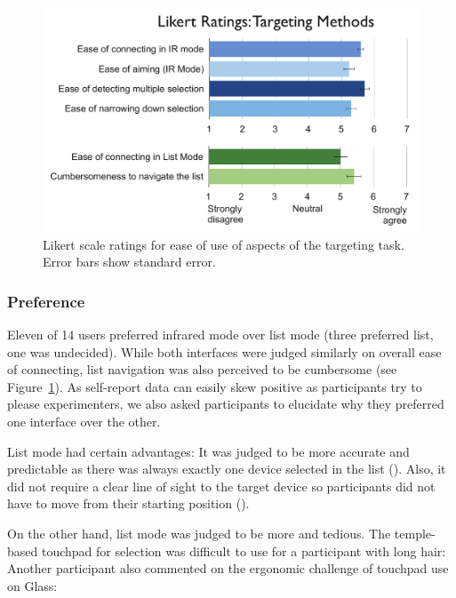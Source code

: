 \begin{figure}[t]
\centering
\includegraphics[width=1.0\columnwidth]{figures/target-likert.pdf}
\caption{Likert scale ratings for ease of use of aspects of the targeting task. Error bars show standard error. }
\label{fig:target-likert}
\end{figure}

\subsubsection{Preference}

Eleven of 14 users preferred infrared mode over list mode (three preferred list, one was undecided). While both interfaces were judged similarly on overall ease of connecting, list navigation was also perceived to be cumbersome (see Figure~\ref{fig:target-likert}). As self-report data can easily skew positive as participants try to please experimenters, we also asked participants to elucidate why they preferred one interface over the other.

List mode had certain advantages: It was judged to be more accurate and predictable as there was always exactly one device selected in the list (). Also, it did not require a clear line of sight to the target device so participants did not have to move from their starting position (). 

On the other hand, list mode was judged to be more  and tedious. The temple-based touchpad for selection was difficult to use for a participant with long hair:  Another participant also commented on the ergonomic challenge of touchpad use on Glass: 

